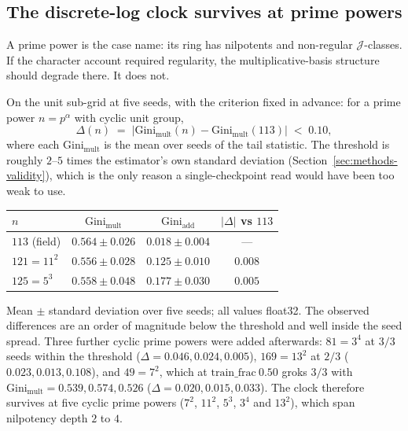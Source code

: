 \subsection{The discrete-log clock survives at prime powers}
\label{sec:clock-primepowers}

A prime power is the case \citet{chen2026multiplication} name: its ring has nilpotents and
non-regular $\mathcal{J}$-classes. If the character account required regularity, the
multiplicative-basis structure should degrade there. It does not.

On the unit sub-grid at five seeds, with the criterion fixed in advance: for a prime power
$n = p^{\alpha}$ with cyclic unit group,
\begin{equation}
  \label{eq:c6}
  \Delta(n) \;=\; \bigl| \mathrm{Gini}_{\text{mult}}(n) - \mathrm{Gini}_{\text{mult}}(113) \bigr|
  \;<\; 0.10 ,
\end{equation}
where each $\mathrm{Gini}_{\text{mult}}$ is the mean over seeds of the tail statistic. The
threshold is roughly $2$--$5$ times the estimator's own standard deviation
(Section~\ref{sec:methods-validity}), which is the only reason a single-checkpoint read would
have been too weak to use.

\begin{center}
\begin{tabular}{lccc}
  \toprule
  $n$ & $\mathrm{Gini}_{\text{mult}}$ & $\mathrm{Gini}_{\text{add}}$ & $|\Delta|$ vs $113$ \\
  \midrule
  $113$ (field) & $0.564 \pm 0.026$ & $0.018 \pm 0.004$ & --- \\
  $121 = 11^{2}$ & $0.556 \pm 0.028$ & $0.125 \pm 0.010$ & $\mathbf{0.008}$ \\
  $125 = 5^{3}$ & $0.558 \pm 0.048$ & $0.177 \pm 0.030$ & $\mathbf{0.005}$ \\
  \bottomrule
\end{tabular}
\end{center}

Mean $\pm$ standard deviation over five seeds; all values float32. The observed differences
are an order of magnitude below the threshold and well inside the seed spread. Three further
cyclic prime powers were added afterwards: $81 = 3^{4}$ at $3/3$ seeds within the threshold
($\Delta = 0.046, 0.024, 0.005$), $169 = 13^{2}$ at $2/3$ ($0.023, 0.013, 0.108$), and
$49 = 7^{2}$, which at $\mathrm{train\_frac}\ 0.50$ groks $3/3$ with
$\mathrm{Gini}_{\text{mult}} = 0.539, 0.574, 0.526$ ($\Delta = 0.020, 0.015, 0.033$). The
clock therefore survives at five cyclic prime powers ($7^{2}$, $11^{2}$, $5^{3}$, $3^{4}$ and
$13^{2}$), which span nilpotency depth $2$ to $4$.

